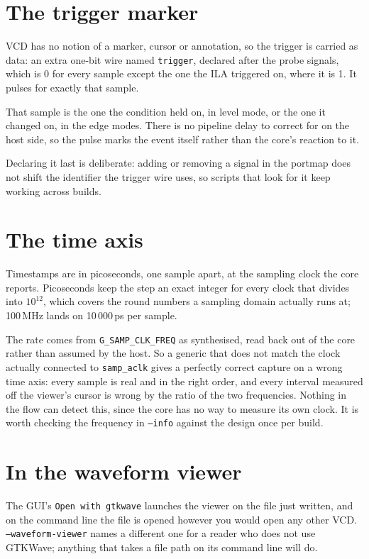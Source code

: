 \documentclass[../manual.tex]{subfiles}
\begin{document}
\section{The trigger marker}
\label{sec:read_trigger}

VCD has no notion of a marker, cursor or annotation, so the trigger is carried as data: an extra one-bit wire named \texttt{trigger}, declared after the probe signals, which is 0 for every sample except the one the ILA triggered on, where it is 1. It pulses for exactly that sample.

That sample is the one the condition held on, in level mode, or the one it changed on, in the edge modes. There is no pipeline delay to correct for on the host side, so the pulse marks the event itself rather than the core's reaction to it.

Declaring it last is deliberate: adding or removing a signal in the portmap does not shift the identifier the trigger wire uses, so scripts that look for it keep working across builds.

\section{The time axis}
\label{sec:read_time}

Timestamps are in picoseconds, one sample apart, at the sampling clock the core reports. Picoseconds keep the step an exact integer for every clock that divides into $10^{12}$, which covers the round numbers a sampling domain actually runs at; 100\,MHz lands on 10\,000\,ps per sample.

The rate comes from \texttt{G\_SAMP\_CLK\_FREQ} as synthesised, read back out of the core rather than assumed by the host. So a generic that does not match the clock actually connected to \texttt{samp\_aclk} gives a perfectly correct capture on a wrong time axis: every sample is real and in the right order, and every interval measured off the viewer's cursor is wrong by the ratio of the two frequencies. Nothing in the flow can detect this, since the core has no way to measure its own clock. It is worth checking the frequency in \texttt{--info} against the design once per build.

\section{In the waveform viewer}
\label{sec:read_gtkwave}

The GUI's \texttt{Open with gtkwave} launches the viewer on the file just written, and on the command line the file is opened however you would open any other VCD. \texttt{--waveform-viewer} names a different one for a reader who does not use GTKWave; anything that takes a file path on its command line will do.
\end{document}
